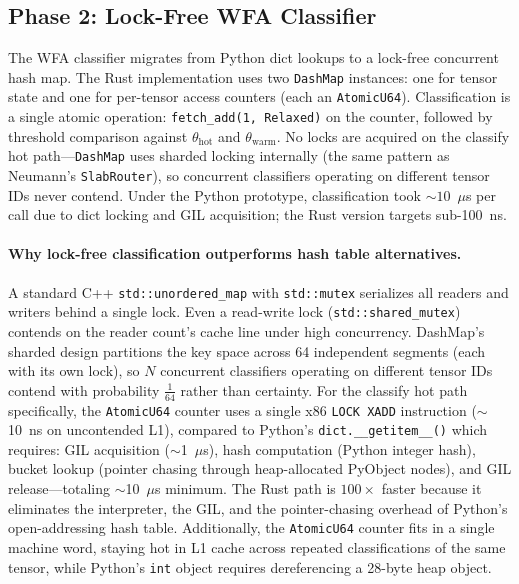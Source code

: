 \documentclass[11pt,letterpaper]{article}
\begin{document}
\subsection{Phase 2: Lock-Free WFA Classifier}

The WFA classifier migrates from Python dict lookups to a lock-free concurrent hash map. The Rust implementation uses two \texttt{DashMap} instances: one for tensor state and one for per-tensor access counters (each an \texttt{AtomicU64}). Classification is a single atomic operation: \texttt{fetch\_add(1, Relaxed)} on the counter, followed by threshold comparison against $\theta_{\text{hot}}$ and $\theta_{\text{warm}}$. No locks are acquired on the classify hot path---\texttt{DashMap} uses sharded locking internally (the same pattern as Neumann's \texttt{SlabRouter}), so concurrent classifiers operating on different tensor IDs never contend. Under the Python prototype, classification took ${\sim}10$~$\mu$s per call due to dict locking and GIL acquisition; the Rust version targets sub-100~ns.

\paragraph{Why lock-free classification outperforms hash table alternatives.}
A standard C++ \texttt{std::unordered\_map} with \texttt{std::mutex} serializes all readers and writers behind a single lock. Even a read-write lock (\texttt{std::shared\_mutex}) contends on the reader count's cache line under high concurrency. DashMap's sharded design partitions the key space across 64 independent segments (each with its own lock), so $N$ concurrent classifiers operating on different tensor IDs contend with probability $\frac{1}{64}$ rather than certainty. For the classify hot path specifically, the \texttt{AtomicU64} counter uses a single x86 \texttt{LOCK XADD} instruction (${\sim}$10~ns on uncontended L1), compared to Python's \texttt{dict.\_\_getitem\_\_()} which requires: GIL acquisition (${\sim}$1~$\mu$s), hash computation (Python integer hash), bucket lookup (pointer chasing through heap-allocated PyObject nodes), and GIL release---totaling ${\sim}$10~$\mu$s minimum. The Rust path is $100\times$ faster because it eliminates the interpreter, the GIL, and the pointer-chasing overhead of Python's open-addressing hash table. Additionally, the \texttt{AtomicU64} counter fits in a single machine word, staying hot in L1 cache across repeated classifications of the same tensor, while Python's \texttt{int} object requires dereferencing a 28-byte heap object.
\end{document}
